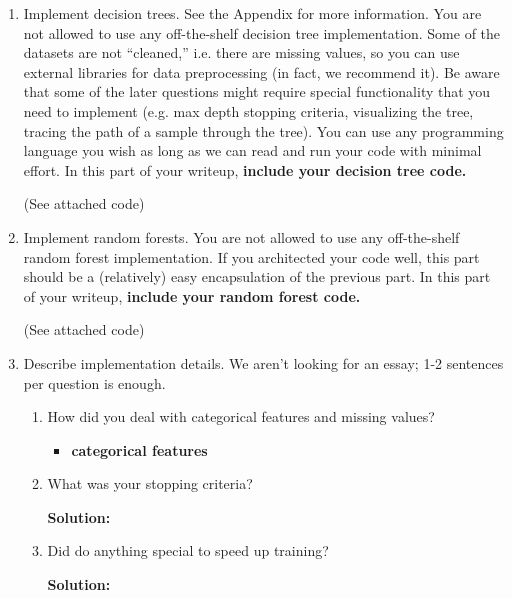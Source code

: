 \documentclass{article}
\newcommand{\solution}{\textbf{Solution: }}
\begin{document}
\begin{enumerate}
    \item Implement decision trees. See the Appendix for more information. You are not allowed to use any off-the-shelf decision tree implementation. Some of the datasets are not “cleaned,” i.e. there are missing values, so you can use external libraries for data preprocessing (in fact, we recommend it). Be aware that some of the later questions might require special functionality that you need to implement (e.g. max depth stopping criteria, visualizing the tree, tracing the path of a sample through the tree). You can use any programming language you wish as long as we can read and run your code with minimal effort. In this part of your writeup, \textbf{include your decision tree code.}
    \begin{mdframed}
    (See attached code)
    \end{mdframed}

    \item Implement random forests. You are not allowed to use any off-the-shelf random forest implementation. If you architected your code well, this part should be a (relatively) easy encapsulation of the previous part. In this part of your writeup, \textbf{include your random forest code.}
    \begin{mdframed}
    (See attached code)
    \end{mdframed}

    \item Describe implementation details. We aren’t looking for an essay; 1-2 sentences per question is enough.
    \begin{enumerate}
        \item How did you deal with categorical features and missing values?
        \begin{mdframed}
          \begin{itemize}
          \item \textbf{categorical features}
          \end{itemize}
        \end{mdframed}

        \item What was your stopping criteria?
        \begin{mdframed} \solution
        \end{mdframed}

        \item Did do anything special to speed up training?
        \begin{mdframed} \solution
        \end{mdframed}


\end{enumerate}
\end{enumerate}
\end{document}
